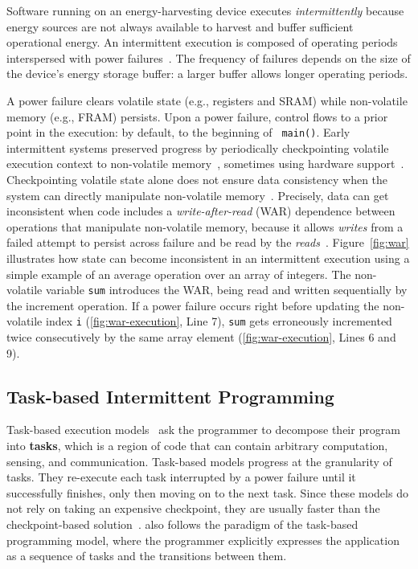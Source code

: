 Software running on an energy-harvesting device executes {\em intermittently}
because energy sources are not always available to harvest and buffer
sufficient operational energy. An intermittent execution is composed of
operating periods interspersed with power
failures~\cite{dino,chain,alpaca,ratchet}. The frequency of failures depends on
the size of the device's energy storage buffer: a larger buffer allows longer
operating periods. 

A power failure clears volatile state (e.g., registers and SRAM) while
non-volatile memory (e.g., FRAM) persists. Upon a power failure, control flows
to a prior point in the execution: by default, to the beginning of {\tt
main()}. Early intermittent systems preserved progress by periodically
checkpointing volatile execution context to non-volatile
memory~\cite{mementos}, sometimes using hardware
support~\cite{mottola2017harvos,hibernusplusplus,hibernus,idetic,quickrecall}. 
%
Checkpointing volatile state alone does not ensure data consistency when the
system can directly manipulate non-volatile memory~\cite{mspcdino}.
Precisely, data can get inconsistent when code includes a
\emph{write-after-read} (WAR) dependence between operations that manipulate
non-volatile memory, because it allows {\em writes} from a failed attempt to
persist across failure and be read by the {\em reads}~\cite{ratchet,dino,alpaca}.
Figure~\ref{fig:war} illustrates how state can become
inconsistent in an intermittent execution using a simple example of an average
operation over an array of integers.
The non-volatile variable \texttt{sum} introduces the WAR, being read and written sequentially
by the increment operation.
If a power failure occurs right before updating the non-volatile index \texttt{i} (\ref{fig:war-execution}, Line 7), \texttt{sum} gets erroneously incremented twice consecutively by the same array element (\ref{fig:war-execution}, Lines 6 and 9).

\subsection{Task-based Intermittent Programming}
\label{section:background_task_computing}

Task-based execution models~\cite{dino,chain,alpaca} ask the programmer to
decompose their program into \textbf{tasks}, which is a region of code that can contain
arbitrary computation, sensing, and communication.  Task-based models progress at the granularity of tasks. They re-execute each task interrupted by a power failure until it successfully finishes, only then moving on to
the next task. Since these models do not rely on taking an expensive
checkpoint, they are usually faster than the checkpoint-based
solution~\cite{chain, alpaca}.  \sys also follows the paradigm of the
task-based programming model, where the programmer explicitly expresses the
application as a sequence of tasks and the transitions between them.

